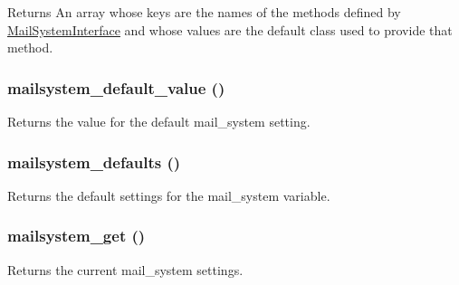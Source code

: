 \begin{DoxyReturn}{Returns}
An array whose keys are the names of the methods defined by \hyperlink{interfaceMailSystemInterface}{MailSystemInterface} and whose values are the default class used to provide that method. 
\end{DoxyReturn}
\hypertarget{mailsystem_8module_ac6dcd069efd821e73a67945b2f18e525}{
\subsubsection[{mailsystem\_\-default\_\-value}]{\setlength{\rightskip}{0pt plus 5cm}mailsystem\_\-default\_\-value ()}}
\label{mailsystem_8module_ac6dcd069efd821e73a67945b2f18e525}
Returns the value for the default mail\_\-system setting. \hypertarget{mailsystem_8module_a167ec538a63c35ea94941d5413ad18eb}{
\subsubsection[{mailsystem\_\-defaults}]{\setlength{\rightskip}{0pt plus 5cm}mailsystem\_\-defaults ()}}
\label{mailsystem_8module_a167ec538a63c35ea94941d5413ad18eb}
Returns the default settings for the mail\_\-system variable. \hypertarget{mailsystem_8module_af474b2a7b012502b3899c3e6c6780e92}{
\subsubsection[{mailsystem\_\-get}]{\setlength{\rightskip}{0pt plus 5cm}mailsystem\_\-get ()}}
\label{mailsystem_8module_af474b2a7b012502b3899c3e6c6780e92}
Returns the current mail\_\-system settings.

